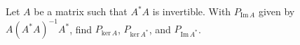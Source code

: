 \documentclass{article}
\begin{document}
  \begin{problem}
    Let $A$ be a matrix such that  $A^{*}A$ is invertible. 
    With $P_{\text{Im}\,A}$ given by $A{(A^{*}A)}^{-1}A^{*}$, find $P_{\text{ker}\,A}$, $P_{\text{ker}\,A^{*}}$, and $P_{\text{Im}\,A^{*}}$. 



  \end{problem}
\end{document}
